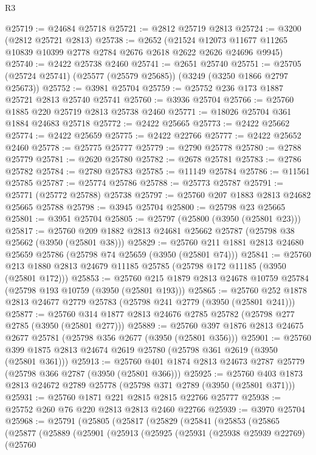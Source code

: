 \begin{lexlean}{R3}
\begin{coremodule}
@25719 := @24684 @25718
@25721 := @2812 @25719 @2813
@25724 := @3200 (@2812 @25721 @2813)
@25738 := @2652
    (@21524 @12073 @11677 @11265 @10839 @10399 @2778 @2784 @2676 @2618 @2622 @2626 @24696 @9945)
@25740 := @2422 @25738 @2460
@25741 := @2651 @25740
@25751 := @25705 (@25724 @25741) (@25577 (@25579 @25685)) (@3249 (@3250 @1866 @2797 @25673))
@25752 := @3981 @25704
@25759 := @25752 @236 @173 @1887 @25721 @2813 @25740 @25741
@25760 := @3936 @25704
@25766 := @25760 @1885 @220 @25719 @2813 @25738 @2460
@25771 := @18026 @25704 @361 @1884 @24683 @25718
@25772 := @2422 @25665
@25773 := @2422 @25662
@25774 := @2422 @25659
@25775 := @2422 @22766
@25777 := @2422 @25652 @2460
@25778 := @25775 @25777
@25779 := @2790 @25778
@25780 := @2788 @25779
@25781 := @2620 @25780
@25782 := @2678 @25781
@25783 := @2786 @25782
@25784 := @2780 @25783
@25785 := @11149 @25784
@25786 := @11561 @25785
@25787 := @25774 @25786
@25788 := @25773 @25787
@25791 := @25771 (@25772 @25788) @25738
@25797 := @25760 @207 @1883 @2813 @24682 @25665 @25788
@25798 := @3945 @25704
@25800 := @25798 @23 @25665
@25801 := @3951 @25704
@25805 := @25797 (@25800 (@3950 (@25801 @23)))
@25817 := @25760 @209 @1882 @2813 @24681 @25662 @25787 (@25798 @38 @25662 (@3950 (@25801 @38)))
@25829 := @25760 @211 @1881 @2813 @24680 @25659 @25786 (@25798 @74 @25659 (@3950 (@25801 @74)))
@25841 := @25760 @213 @1880 @2813 @24679 @11185 @25785 (@25798 @172 @11185 (@3950 (@25801 @172)))
@25853 := @25760 @215 @1879 @2813 @24678 @10759 @25784 (@25798 @193 @10759 (@3950 (@25801 @193)))
@25865 := @25760 @252 @1878 @2813 @24677 @2779 @25783 (@25798 @241 @2779 (@3950 (@25801 @241)))
@25877 := @25760 @314 @1877 @2813 @24676 @2785 @25782 (@25798 @277 @2785 (@3950 (@25801 @277)))
@25889 := @25760 @397 @1876 @2813 @24675 @2677 @25781 (@25798 @356 @2677 (@3950 (@25801 @356)))
@25901 := @25760 @399 @1875 @2813 @24674 @2619 @25780 (@25798 @361 @2619 (@3950 (@25801 @361)))
@25913 := @25760 @401 @1874 @2813 @24673 @2787 @25779 (@25798 @366 @2787 (@3950 (@25801 @366)))
@25925 := @25760 @403 @1873 @2813 @24672 @2789 @25778 (@25798 @371 @2789 (@3950 (@25801 @371)))
@25931 := @25760 @1871 @221 @2815 @2815 @22766 @25777
@25938 := @25752 @260 @76 @220 @2813 @2813 @2460 @22766
@25939 := @3970 @25704
@25968 := @25791
    (@25805
      (@25817
        (@25829
          (@25841
            (@25853
              (@25865
                (@25877
                  (@25889
                    (@25901
                      (@25913
                        (@25925
                          (@25931
                            (@25938 @25939 @22769)
                            (@25760

\end{coremodule}
\end{lexlean}
